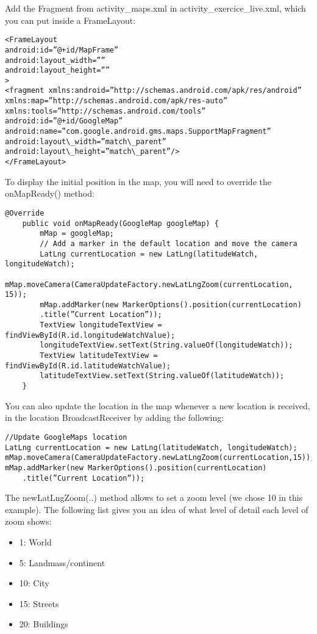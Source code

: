 \documentclass[11pt]{article}
\begin{document}
Add the Fragment from activity\_maps.xml in activity\_exercice\_live.xml, which you can put inside a FrameLayout:
\begin{lstlisting}
<FrameLayout
android:id=”@+id/MapFrame”
android:layout_width=””
android:layout_height=””
>
<fragment xmlns:android=”http://schemas.android.com/apk/res/android”
xmlns:map=”http://schemas.android.com/apk/res-auto”
xmlns:tools=”http://schemas.android.com/tools”
android:id=”@+id/GoogleMap”
android:name=”com.google.android.gms.maps.SupportMapFragment”
android:layout\_width=”match\_parent”
android:layout\_height=”match\_parent”/>
</FrameLayout>
\end{lstlisting}

To display the initial position in the map, you will need to override the onMapReady() method:
\begin{lstlisting}
@Override
    public void onMapReady(GoogleMap googleMap) {
        mMap = googleMap;
        // Add a marker in the default location and move the camera
        LatLng currentLocation = new LatLng(latitudeWatch, longitudeWatch);
        mMap.moveCamera(CameraUpdateFactory.newLatLngZoom(currentLocation, 15));
        mMap.addMarker(new MarkerOptions().position(currentLocation)
        .title(”Current Location”));
        TextView longitudeTextView = findViewById(R.id.longitudeWatchValue);
        longitudeTextView.setText(String.valueOf(longitudeWatch));
        TextView latitudeTextView = findViewById(R.id.latitudeWatchValue);
        latitudeTextView.setText(String.valueOf(latitudeWatch));
    }
\end{lstlisting}

You can also update the location in the map whenever a new location is received, in the
location BroadcastReceiver by adding the following:
\begin{lstlisting}
//Update GoogleMaps location
LatLng currentLocation = new LatLng(latitudeWatch, longitudeWatch);
mMap.moveCamera(CameraUpdateFactory.newLatLngZoom(currentLocation,15));
mMap.addMarker(new MarkerOptions().position(currentLocation)
    .title(”Current Location”));
\end{lstlisting}
The newLatLngZoom(..) method allows to set a zoom level (we chose 10 in this example).
The following list gives you an idea of what level of detail each level of zoom shows:
\begin{itemize}
    \item 1: World
    \item 5: Landmass/continent
    \item 10: City
    \item 15: Streets
    \item 20: Buildings
\end{itemize}
\end{document}
